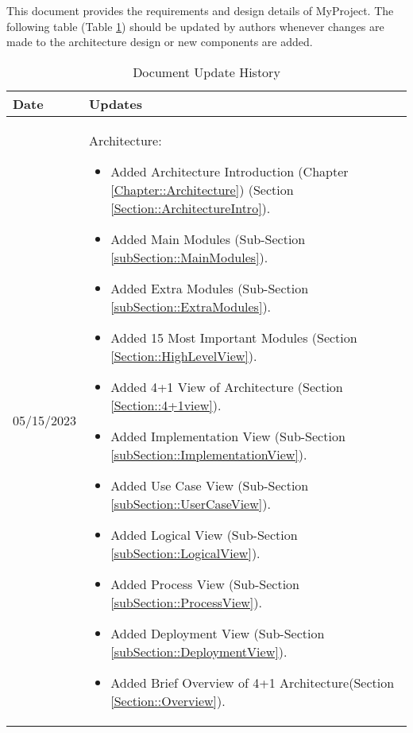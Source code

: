 This document provides the requirements and design details of MyProject.  
The following table (Table \ref{Table::UpdateHistory}) should be
updated by authors whenever changes are made to the architecture
design or new components are added.  

\begin{longtable}{|l||p{13.5cm}|}
\caption{Document Update History \label{Table::UpdateHistory}}\\
\hline
\textbf{Date} & \textbf{Updates} \\
\hline 
\endhead

05/15/2023 & Architecture:
\begin{itemize}[topsep=0pt,itemsep=0pt,parsep=0pt,partopsep=0pt,leftmargin=12pt]
\item Added Architecture Introduction (Chapter \ref{Chapter::Architecture}) (Section \ref{Section::ArchitectureIntro}). 
\item Added Main Modules (Sub-Section \ref{subSection::MainModules}).
\item Added Extra Modules (Sub-Section \ref{subSection::ExtraModules}).
\item Added 15 Most Important Modules (Section \ref{Section::HighLevelView}).
\item Added 4+1 View of Architecture (Section \ref{Section::4+1view}).
\item Added Implementation View (Sub-Section \ref{subSection::ImplementationView}).
\item Added Use Case View (Sub-Section \ref{subSection::UserCaseView}).
\item Added Logical View (Sub-Section \ref{subSection::LogicalView}).
\item Added Process View (Sub-Section \ref{subSection::ProcessView}).
\item Added Deployment View (Sub-Section \ref{subSection::DeploymentView}).
\item Added Brief Overview of 4+1 Architecture(Section \ref{Section::Overview}).
\end{itemize} 
\\ \hline


\end{longtable}
